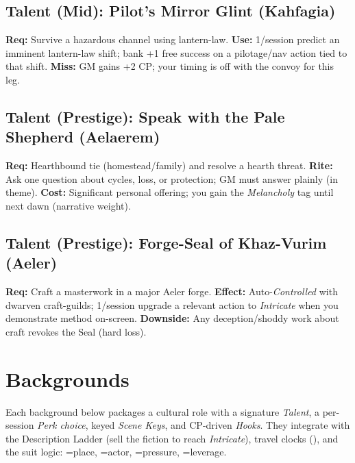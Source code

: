 \subsection{Talent (Mid): Pilot's Mirror Glint (Kahfagia)}
\textbf{Req:} Survive a hazardous channel using lantern-law.
\textbf{Use:} 1/session predict an imminent lantern-law shift; bank +1 free success on a pilotage/nav action tied to that shift.
\textbf{Miss:} GM gains +2 CP; your timing is off with the convoy for this leg.

\subsection{Talent (Prestige): Speak with the Pale Shepherd (Aelaerem)}
\textbf{Req:} Hearthbound tie (homestead/family) and resolve a hearth threat.
\textbf{Rite:} Ask one question about cycles, loss, or protection; GM must answer plainly (in theme).
\textbf{Cost:} Significant personal offering; you gain the \emph{Melancholy} tag until next dawn (narrative weight).

\subsection{Talent (Prestige): Forge-Seal of Khaz-Vurim (Aeler)}
\textbf{Req:} Craft a masterwork in a major Aeler forge.
\textbf{Effect:} Auto-\emph{Controlled} with dwarven craft-guilds; 1/session upgrade a relevant action to \emph{Intricate} when you demonstrate method on-screen.
\textbf{Downside:} Any deception/shoddy work about craft revokes the Seal (hard loss).


\section{Backgrounds}
Each background below packages a cultural role with a signature \emph{Talent}, a per-session \emph{Perk choice}, keyed \emph{Scene Keys}, and CP-driven \emph{Hooks}. They integrate with the Description Ladder (sell the fiction to reach \emph{Intricate}), travel clocks (\ClockSizes), and the suit logic: \SuitSpade{}=place, \SuitHeart{}=actor, \SuitClub{}=pressure, \SuitDiamond{}=leverage.

